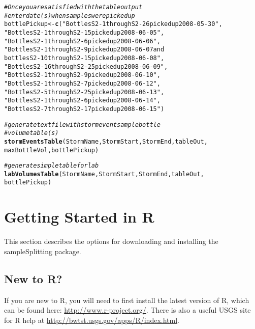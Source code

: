 \documentclass[a4paper,11pt]{article}\usepackage[]{graphicx}\usepackage[]{color}
\makeatletter
\newcommand{\hlstr}[1]{\textcolor[rgb]{0.192,0.494,0.8}{#1}}%
\newcommand{\hlcom}[1]{\textcolor[rgb]{0.678,0.584,0.686}{\textit{#1}}}%
\newcommand{\hlstd}[1]{\textcolor[rgb]{0.345,0.345,0.345}{#1}}%
\newcommand{\hlkwb}[1]{\textcolor[rgb]{0.69,0.353,0.396}{#1}}%
\newcommand{\hlkwd}[1]{\textcolor[rgb]{0.737,0.353,0.396}{\textbf{#1}}}%
\newenvironment{kframe}{%
 \def\at@end@of@kframe{}%
 \ifinner\ifhmode%
  \def\at@end@of@kframe{\end{minipage}}%
  \begin{minipage}{\columnwidth}%
 \fi\fi%
 \def\FrameCommand##1{\hskip\@totalleftmargin \hskip-\fboxsep
 \colorbox{shadecolor}{##1}\hskip-\fboxsep
     \hskip-\linewidth \hskip-\@totalleftmargin \hskip\columnwidth}%
 \MakeFramed {\advance\hsize-\width
   \@totalleftmargin\z@ \linewidth\hsize
   \@setminipage}}%
 {\par\unskip\endMakeFramed%
 \at@end@of@kframe}
\newenvironment{knitrout}{}{} %
\makeatother
\begin{document}
\begin{knitrout}
\color{fgcolor}\begin{kframe}
\begin{alltt}
\hlcom{#Once you are satisfied with the table output}
\hlcom{#enter date(s) when samples were picked up }
\hlstd{bottlePickup} \hlkwb{<-} \hlkwd{c}\hlstd{(}\hlstr{"Bottles S2-1 through S2-26 picked up 2008-05-30"}\hlstd{,}
                  \hlstr{"Bottles S2-1 through S2-15 picked up 2008-06-05"}\hlstd{,}
                  \hlstr{"Bottles S2-1 through S2-6 picked up 2008-06-06"}\hlstd{,}
                  \hlstr{"Bottles S2-1 through S2-9 picked up 2008-06-07 and 
                  bottles S2-10 through S2-15 picked up 2008-06-08"}\hlstd{,}
                  \hlstr{"Bottles S2-16 through S2-25 picked up 2008-06-09"}\hlstd{,}
                  \hlstr{"Bottles S2-1 through S2-9 picked up 2008-06-10"}\hlstd{,}
                  \hlstr{"Bottles S2-1 through S2-7 picked up 2008-06-12"}\hlstd{,}
                  \hlstr{"Bottles S2-5 through S2-25 picked up 2008-06-13"}\hlstd{,}
                  \hlstr{"Bottles S2-1 through S2-6 picked up 2008-06-14"}\hlstd{,}
                  \hlstr{"Bottles S2-7 through S2-17 picked up 2008-06-15"}\hlstd{)}

\hlcom{# generate text file with storm event sample bottle }
\hlcom{# volume table(s)}
\hlkwd{stormEventsTable}\hlstd{(StormName,StormStart,StormEnd,tableOut,}
                 \hlstd{maxBottleVol,bottlePickup)}

\hlcom{# generate simple table for lab}
\hlkwd{labVolumesTable}\hlstd{(StormName,StormStart,StormEnd,tableOut,}
                \hlstd{bottlePickup)}
\end{alltt}
\end{kframe}
\end{knitrout}

\FloatBarrier
\clearpage

\section{Getting Started in R}
\label{sec:started}
This section describes the options for downloading and installing the sampleSplitting package.

\subsection{New to R?}
If you are new to R, you will need to first install the latest version of R, which can be found here: \url{http://www.r-project.org/}. There is also a useful USGS site for R help at \url{http://bwtst.usgs.gov/apps/R/index.html}.
\end{document}
